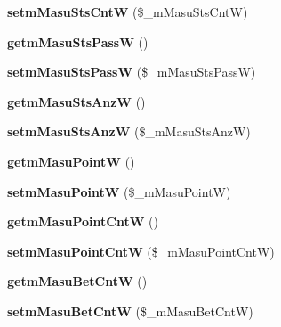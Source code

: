\begin{DoxyCompactItemize}
\item 
{\bfseries setm\+Masu\+Sts\+CntW} (\$\+\_\+m\+Masu\+Sts\+CntW)\hypertarget{class_reversi_a112112f495910acedc8ec201fa669ae3}{}\label{class_reversi_a112112f495910acedc8ec201fa669ae3}

\item 
{\bfseries getm\+Masu\+Sts\+PassW} ()\hypertarget{class_reversi_a51598ce2b9166a720cf2f9de321c00eb}{}\label{class_reversi_a51598ce2b9166a720cf2f9de321c00eb}

\item 
{\bfseries setm\+Masu\+Sts\+PassW} (\$\+\_\+m\+Masu\+Sts\+PassW)\hypertarget{class_reversi_a76f39ccd1a55c6202985c310af21448d}{}\label{class_reversi_a76f39ccd1a55c6202985c310af21448d}

\item 
{\bfseries getm\+Masu\+Sts\+AnzW} ()\hypertarget{class_reversi_a2e6dc6afd4e1f554a3a314e2638dc5aa}{}\label{class_reversi_a2e6dc6afd4e1f554a3a314e2638dc5aa}

\item 
{\bfseries setm\+Masu\+Sts\+AnzW} (\$\+\_\+m\+Masu\+Sts\+AnzW)\hypertarget{class_reversi_a2fa42edd87104a0048ca0efecbb59708}{}\label{class_reversi_a2fa42edd87104a0048ca0efecbb59708}

\item 
{\bfseries getm\+Masu\+PointW} ()\hypertarget{class_reversi_ad8037037ea6c12c5f72bb1d1b5802d98}{}\label{class_reversi_ad8037037ea6c12c5f72bb1d1b5802d98}

\item 
{\bfseries setm\+Masu\+PointW} (\$\+\_\+m\+Masu\+PointW)\hypertarget{class_reversi_a216f8ea81ed1a4d567bcbb9efe03b358}{}\label{class_reversi_a216f8ea81ed1a4d567bcbb9efe03b358}

\item 
{\bfseries getm\+Masu\+Point\+CntW} ()\hypertarget{class_reversi_aa34fdde67253d92780a746ab64371956}{}\label{class_reversi_aa34fdde67253d92780a746ab64371956}

\item 
{\bfseries setm\+Masu\+Point\+CntW} (\$\+\_\+m\+Masu\+Point\+CntW)\hypertarget{class_reversi_ab0ec543b38c99910b3f4b254c757b9b3}{}\label{class_reversi_ab0ec543b38c99910b3f4b254c757b9b3}

\item 
{\bfseries getm\+Masu\+Bet\+CntW} ()\hypertarget{class_reversi_a513ff1271786bb02da384150ee891453}{}\label{class_reversi_a513ff1271786bb02da384150ee891453}

\item 
{\bfseries setm\+Masu\+Bet\+CntW} (\$\+\_\+m\+Masu\+Bet\+CntW)\hypertarget{class_reversi_ae2b4be273c04556474b686db886cc97b}{}\label{class_reversi_ae2b4be273c04556474b686db886cc97b}


\end{DoxyCompactItemize}
